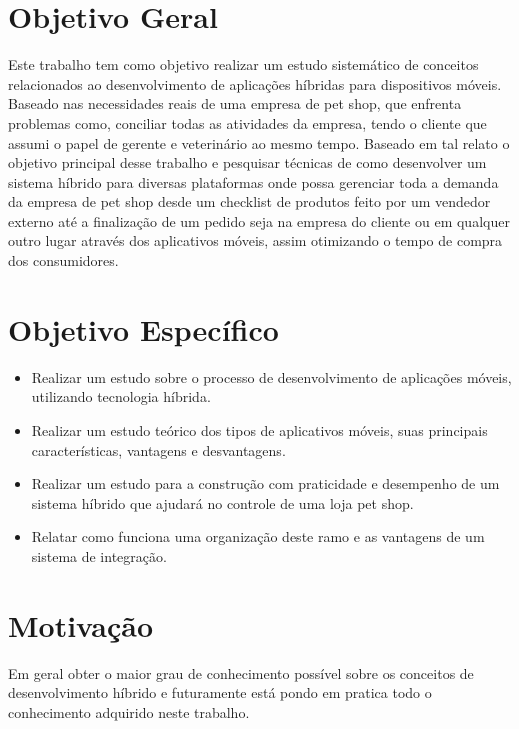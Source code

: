 \documentclass[12pt,openright,twoside,a4paper,english,french,spanish,brazil]{abntex2}
\begin{document}

\section*{Objetivo Geral}
Este trabalho tem como objetivo realizar um estudo sistemático de conceitos relacionados ao desenvolvimento de aplicações híbridas para dispositivos móveis. Baseado nas necessidades reais de uma empresa de pet shop, que enfrenta problemas como, conciliar todas as atividades da empresa, tendo o cliente que assumi o papel de gerente e veterinário ao mesmo tempo.
Baseado em tal relato o objetivo principal desse trabalho e pesquisar técnicas de como desenvolver um sistema híbrido para diversas plataformas onde possa gerenciar toda a demanda da empresa de pet shop desde um checklist de produtos feito por um vendedor externo até a finalização de um pedido seja na empresa do cliente ou em qualquer outro lugar através dos aplicativos móveis, assim otimizando o tempo de compra dos consumidores.

\section*{Objetivo Específico}
\begin{itemize}
\item Realizar um estudo sobre o processo de desenvolvimento de aplicações móveis, utilizando tecnologia híbrida.
\item Realizar um estudo teórico dos tipos de aplicativos móveis, suas principais características, vantagens e desvantagens.
\item Realizar um estudo para a construção com praticidade e desempenho de um sistema híbrido que ajudará no controle de uma loja pet shop.
\item Relatar como funciona uma organização deste ramo e as vantagens de um sistema de integração.
\end{itemize}

\section*{Motivação}
Em geral obter o maior grau de conhecimento possível sobre os conceitos de desenvolvimento híbrido e futuramente está pondo em pratica todo o conhecimento adquirido neste trabalho. 
\end{document}
